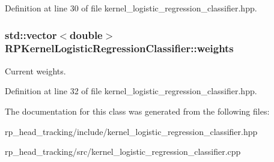 \-Definition at line 30 of file kernel\-\_\-logistic\-\_\-regression\-\_\-classifier.\-hpp.

\hypertarget{class_r_p_kernel_logistic_regression_classifier_a0c1b9e50db833060a56d2bbeddcaac6b}{
\subsubsection[{weights}]{\setlength{\rightskip}{0pt plus 5cm}std\-::vector$<$double$>$ {\bf \-R\-P\-Kernel\-Logistic\-Regression\-Classifier\-::weights}}}\label{class_r_p_kernel_logistic_regression_classifier_a0c1b9e50db833060a56d2bbeddcaac6b}
\-Current weights. 

\-Definition at line 32 of file kernel\-\_\-logistic\-\_\-regression\-\_\-classifier.\-hpp.



\-The documentation for this class was generated from the following files\-:\begin{DoxyCompactItemize}
\item 
rp\-\_\-head\-\_\-tracking/include/kernel\-\_\-logistic\-\_\-regression\-\_\-classifier.\-hpp\item 
rp\-\_\-head\-\_\-tracking/src/kernel\-\_\-logistic\-\_\-regression\-\_\-classifier.\-cpp\end{DoxyCompactItemize}
